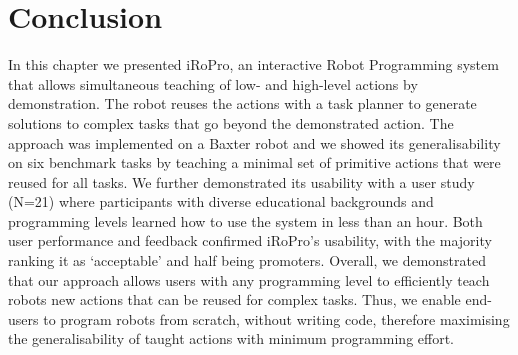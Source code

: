 \section{Conclusion} 
\label{sec:conclusion}
In this chapter we presented iRoPro, an interactive Robot Programming system that allows simultaneous teaching of low- and high-level actions by demonstration.
The robot reuses the actions with a task planner to generate solutions to complex tasks that go beyond the demonstrated action.
The approach was implemented on a Baxter robot and we showed its generalisability on six benchmark tasks by teaching a minimal set of primitive actions that were reused for all tasks.
We further demonstrated its usability with a user study (N=21) where participants with diverse educational backgrounds and programming levels learned how to use the system in less than an hour.
Both user performance and feedback confirmed iRoPro's usability, with the majority ranking it as `acceptable' and half being promoters.
Overall, we demonstrated that our approach allows users with any programming level to efficiently teach robots new actions that can be reused for complex tasks.
Thus, we enable end-users to program robots from scratch, without writing code, therefore maximising the generalisability of taught actions with minimum programming effort.